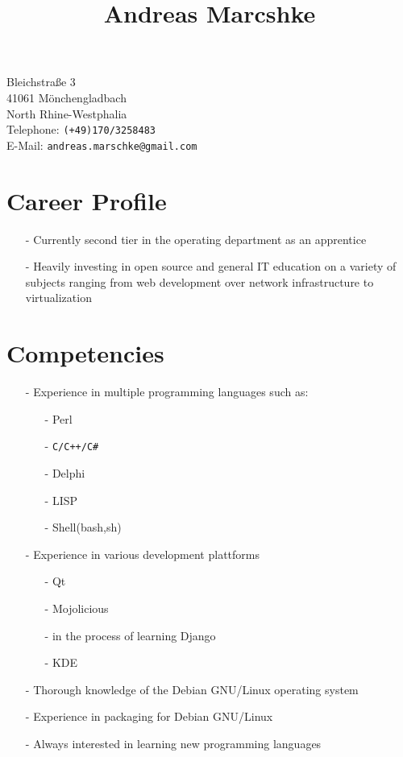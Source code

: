 \documentclass[11pt]{article}
\title{Andreas Marcshke}
\date{}
\begin{document}
\maketitle

Bleichstraße 3 \\
41061 Mönchengladbach \\
North Rhine-Westphalia \\
Telephone: \texttt{(+49)170/3258483} \\
E-Mail: \texttt{andreas.marschke@gmail.com}


\section*{Career Profile}


\begin{itemize}
  \item[-] Currently second tier in the operating department as an apprentice
  \item[-] Heavily investing in open source and general IT education
    on a variety of subjects ranging from web development over network
    infrastructure to virtualization
\end{itemize}

\section*{Competencies}

\thispagestyle{empty}
\begin{itemize}
  \item[-] Experience in multiple programming languages such as:
    \begin{itemize}
      \item[-] Perl
      \item[-] \verb*|C/C++/C#|
      \item[-] Delphi
      \item[-] LISP
      \item[-] Shell(bash,sh)
    \end{itemize}

  \item[-] Experience in various development plattforms
    \begin{itemize}
      \item[-] Qt
      \item[-] Mojolicious
      \item[-] in the process of learning Django
      \item[-] KDE
    \end{itemize}
  \item[-] Thorough knowledge of the Debian GNU/Linux operating
    system
  \item[-] Experience in packaging for Debian GNU/Linux
  \item[-] Always interested in learning new programming
    languages
\end{itemize}
\end{document}
